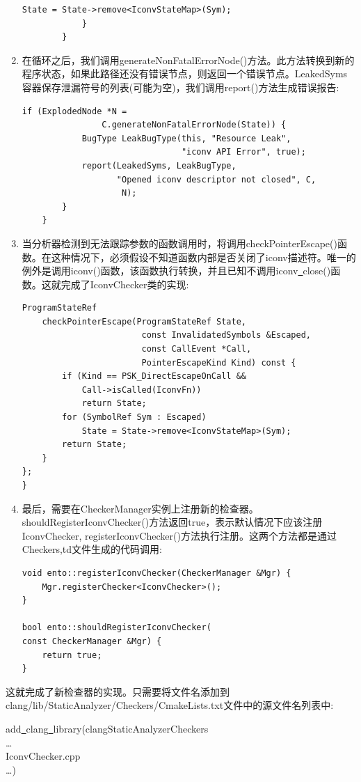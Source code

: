\begin{enumerate}
\begin{lstlisting}[caption={}]
				State = State->remove<IconvStateMap>(Sym);
			}
		}
\end{lstlisting}

\item 在循环之后，我们调用generateNonFatalErrorNode()方法。此方法转换到新的程序状态，如果此路径还没有错误节点，则返回一个错误节点。LeakedSyms容器保存泄漏符号的列表(可能为空)，我们调用report()方法生成错误报告:
\begin{lstlisting}[caption={}]
		if (ExplodedNode *N =
				C.generateNonFatalErrorNode(State)) {
			BugType LeakBugType(this, "Resource Leak",
								"iconv API Error", true);
			report(LeakedSyms, LeakBugType,
				   "Opened iconv descriptor not closed", C,
					N);
		}
	}
\end{lstlisting}

\item 当分析器检测到无法跟踪参数的函数调用时，将调用checkPointerEscape()函数。在这种情况下，必须假设不知道函数内部是否关闭了iconv描述符。唯一的例外是调用iconv()函数，该函数执行转换，并且已知不调用iconv\underline{~}close()函数。这就完成了IconvChecker类的实现:
\begin{lstlisting}[caption={}]
	ProgramStateRef
	checkPointerEscape(ProgramStateRef State,
						const InvalidatedSymbols &Escaped,
						const CallEvent *Call,
						PointerEscapeKind Kind) const {
		if (Kind == PSK_DirectEscapeOnCall &&
			Call->isCalled(IconvFn))
			return State;
		for (SymbolRef Sym : Escaped)
			State = State->remove<IconvStateMap>(Sym);
		return State;
	}
};
}
\end{lstlisting}

\item 最后，需要在CheckerManager实例上注册新的检查器。shouldRegisterIconvChecker()方法返回true，表示默认情况下应该注册IconvChecker, registerIconvChecker()方法执行注册。这两个方法都是通过Checkers,td文件生成的代码调用:
\begin{lstlisting}[caption={}]
void ento::registerIconvChecker(CheckerManager &Mgr) {
	Mgr.registerChecker<IconvChecker>();
}

bool ento::shouldRegisterIconvChecker(
const CheckerManager &Mgr) {
	return true;
}
\end{lstlisting}

\end{enumerate}

这就完成了新检查器的实现。只需要将文件名添加到clang/lib/StaticAnalyzer/Checkers/CmakeLists.txt文件中的源文件名列表中:\par

\begin{tcolorbox}[colback=white,colframe=black]
add\underline{~}clang\underline{~}library(clangStaticAnalyzerCheckers \\
… \\
\hspace*{0.5cm}IconvChecker.cpp \\
…)
\end{tcolorbox}

